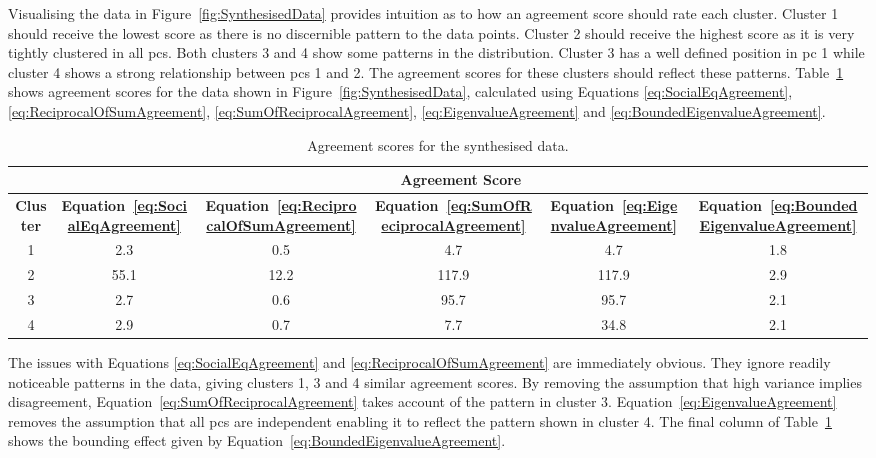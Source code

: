 			Visualising the data in Figure~\ref{fig:SynthesisedData} provides intuition as to how an agreement
			score should rate each cluster. Cluster 1 should receive the lowest score as there is no
			discernible pattern to the data points. Cluster 2 should receive the highest score as it is very
			tightly clustered in all \acrshort{pc}s. Both clusters 3 and 4 show some patterns in the
			distribution. Cluster 3 has a well defined position in \acrshort{pc} 1 while cluster 4 shows a
			strong relationship between \acrshort{pc}s 1 and 2. The agreement scores for these clusters should
			reflect these patterns.  Table~\ref{tab:SynthesisedDataAgreement} shows agreement scores for the
			data shown in Figure~\ref{fig:SynthesisedData}, calculated using Equations
			\ref{eq:SocialEqAgreement}, \ref{eq:ReciprocalOfSumAgreement}, \ref{eq:SumOfReciprocalAgreement},
			\ref{eq:EigenvalueAgreement} and \ref{eq:BoundedEigenvalueAgreement}.

			\begin{table}[h!]
				\centering
				\begin{tabular}{|c|c|c|c|c|c|}
					\cline{2-6}
					\multicolumn{1}{c|}{} & \multicolumn{5}{c|}{\bf{Agreement Score}} \tabularnewline
					\hline
					\bf{Cluster} & \bf{Equation~\ref{eq:SocialEqAgreement}} & 
					\bf{Equation~\ref{eq:ReciprocalOfSumAgreement}} &
					\bf{Equation~\ref{eq:SumOfReciprocalAgreement}} & 
					\bf{Equation~\ref{eq:EigenvalueAgreement}} &
					\bf{Equation~\ref{eq:BoundedEigenvalueAgreement}} \tabularnewline
					\hline
					\hline
					1 & 2.3 & 0.5 & 4.7 & 4.7 & 1.8 \tabularnewline
					\hline
					2 & 55.1 & 12.2 & 117.9 & 117.9 & 2.9 \tabularnewline
					\hline
					3 & 2.7 & 0.6 & 95.7 & 95.7 & 2.1 \tabularnewline
					\hline
					4 & 2.9 & 0.7 & 7.7 & 34.8 & 2.1 \tabularnewline
					\hline
				\end{tabular}
				\caption{Agreement scores for the synthesised data.}
				\label{tab:SynthesisedDataAgreement}
			\end{table}

			The issues with Equations \ref{eq:SocialEqAgreement} and \ref{eq:ReciprocalOfSumAgreement} are
			immediately obvious. They ignore readily noticeable patterns in the data, giving clusters 1, 3 and
			4 similar agreement scores. By removing the assumption that high variance implies disagreement,
			Equation~\ref{eq:SumOfReciprocalAgreement} takes account of the pattern in cluster 3.
			Equation~\ref{eq:EigenvalueAgreement} removes the assumption that all \acrshort{pc}s are
			independent enabling it to reflect the pattern shown in cluster 4. The final column of
			Table~\ref{tab:SynthesisedDataAgreement} shows the bounding effect given by
			Equation~\ref{eq:BoundedEigenvalueAgreement}.

